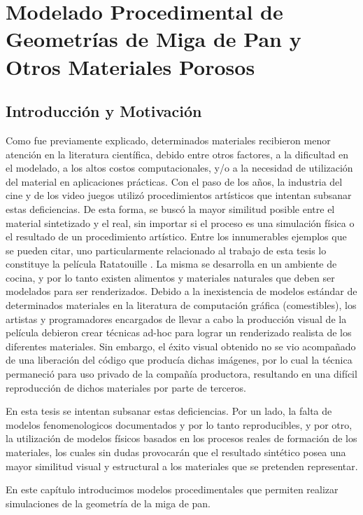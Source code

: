 \chapter[Modelado de la Geometría de Miga de Pan]{Modelado Procedimental de Geometrías de Miga de Pan y Otros Materiales Porosos}

\section{Introducción y Motivación} %
Como fue previamente explicado, determinados materiales recibieron menor atención en la literatura científica, debido entre otros factores, a la dificultad en el modelado, a los altos costos computacionales, y/o a la necesidad de utilización del material en aplicaciones prácticas.
Con el paso de los a\~nos, la industria del cine y de los video juegos utilizó procedimientos artísticos que intentan subsanar estas deficiencias.
De esta forma, se busc\'o la mayor similitud posible entre el material sintetizado y el real, sin importar si el proceso es una simulación física o el resultado de un procedimiento artístico.
Entre los innumerables ejemplos que se pueden citar, uno particularmente relacionado al trabajo de esta tesis lo constituye la película Ratatouille \cite{Cho2007}.
La misma se desarrolla en un ambiente de cocina, y por lo tanto existen alimentos y materiales naturales que deben ser modelados para ser renderizados.
Debido a la inexistencia de modelos estándar de determinados materiales en la literatura de computación gráfica (comestibles), los artistas y programadores encargados de llevar a cabo la producción visual de la película debieron crear técnicas ad-hoc para lograr un renderizado realista de los diferentes materiales.
Sin embargo, el éxito visual obtenido no se vio acompañado de una liberación del código que producía dichas imágenes, por lo cual la técnica permaneció para uso privado de la compañía productora, resultando en una difícil reproducción de dichos materiales por parte de terceros.

En esta tesis se intentan subsanar estas deficiencias.
Por un lado, la falta de modelos fenomenologicos documentados y por lo tanto reproducibles, y por otro, la utilización de modelos físicos basados en los procesos reales de formación de los materiales, los cuales sin dudas provocarán que el resultado sintético posea una mayor similitud visual y estructural a los materiales que se pretenden representar.

En este capítulo introducimos modelos procedimentales que permiten realizar simulaciones de la geometr\'ia de la miga de pan.

